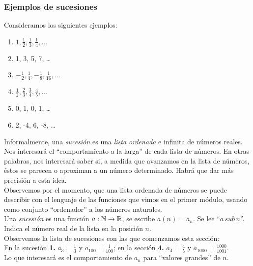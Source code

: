 \documentclass[../Teoría.root.tex]{subfiles}
\begin{document}
\subsubsection{Ejemplos de sucesiones}
Consideramos los siguientes ejemplos:
\begin{enumerate}
    \item \(1,\frac{1}{2},\frac{1}{3},\frac{1}{4},\dots\)
    \item 1, 3, 5, 7, \dots
    \item \(-\frac{1}{2},\frac{1}{4},-\frac{1}{8},\frac{1}{16},\dots\)
    \item \(\frac{1}{2},\frac{2}{3},\frac{3}{4},\frac{4}{5},\dots\)
    \item 0, 1, 0, 1, \dots
    \item 2, -4, 6, -8, \dots
\end{enumerate}
Informalmente, una \textit{sucesión} es una \textit{lista ordenada} e infinita de números reales.\\
Nos interesará el “comportamiento a la larga” de cada lista de números.
En otras palabras, nos interesará saber si, a medida que avanzamos en la lista de números, éstos se parecen o aproximan a un número determinado.
Habrá que dar más precisión a esta idea.\\
Observemos por el momento, que una lista ordenada de números se puede describir con el lenguaje de las funciones que vimos en el primer módulo, usando como conjunto “ordenador” a los números naturales.\\
Una \textit{sucesión} es una función \(a:\mathbb{N}\rightarrow\mathbb{R}\), se escribe \(a(n)=a_n\).
Se lee “\(a\,sub\,n\)”.
Indica el número real de la lista en la posición \(n\).\\
Observemos la lista de sucesiones con las que comenzamos esta sección:\\
En la sucesión \textbf{1.} \(a_3=\frac{1}{3}\) y \(a_{100}=\frac{1}{100}\); en la sección \textbf{4.} \(a_4=\frac{4}{5}\) y \(a_{1000}=\frac{1000}{1001}\).\\
Lo que interesará es el comportamiento de \(a_n\) para “valores grandes” de \(n\).
\end{document}

